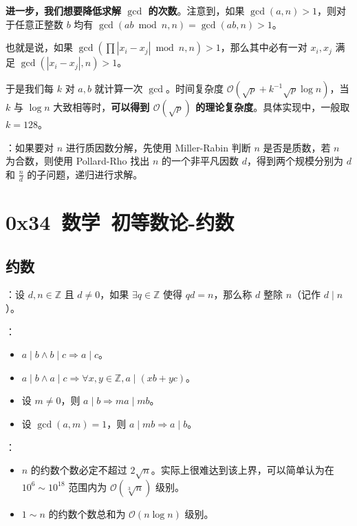 \textbf{进一步，我们想要降低求解 $\gcd$ 的次数}。注意到，如果 $\gcd(a, n) > 1$，则对于任意正整数 $b$ 均有 $\gcd(ab \bmod n, n) = \gcd(ab, n) > 1$。

也就是说，如果 $\gcd\left(\prod |x_i - x_j| \bmod n, n\right) > 1$，那么其中必有一对 $x_i, x_j$ 满足 $\gcd(|x_i - x_j|, n) > 1$。

于是我们每 $k$ 对 $a, b$ 就计算一次 $\gcd$。时间复杂度 $\mathcal{O}(\sqrt{p} + k^{-1}\sqrt{p} \log n)$，当 $k$ 与 $\log n$ 大致相等时，\textbf{可以得到 $\mathcal{O}(\sqrt{p})$ 的理论复杂度}。具体实现中，一般取 $k = 128$。

：如果要对 $n$ 进行质因数分解，先使用 Miller-Rabin 判断 $n$ 是否是质数，若 $n$ 为合数，则使用 Pollard-Rho 找出 $n$ 的一个非平凡因数 $d$，得到两个规模分别为 $d$ 和 $\frac{n}{d}$ 的子问题，递归进行求解。


\section{0x34\ 数学\ 初等数论-约数}
\label{sec:0x34b}

\subsection{约数}

：设 $d, n \in \mathbb{Z}$ 且 $d \neq 0$，如果 $\exists q \in \mathbb{Z}$ 使得 $qd = n$，那么称 $d$ 整除 $n$（记作 $d \mid n$）。

：

\begin{itemize}
    \item $a \mid b \land b \mid c \Longrightarrow a\mid c$。
    \item $a \mid b \land a \mid c \Longrightarrow \forall x, y \in \mathbb{Z}, a \mid (xb + yc)$。
    \item 设 $m \neq 0$，则 $a \mid b \Longrightarrow ma \mid mb$。
    \item 设 $\gcd(a, m) = 1$，则 $a \mid mb \Longrightarrow a\mid b$。
\end{itemize}

：

\begin{itemize}
    \item $n$ 的约数个数必定不超过 $2\sqrt{n}$。实际上很难达到该上界，可以简单认为在 $10^6 \sim 10^{18}$ 范围内为 $\mathcal{O}(\sqrt[3]{n})$ 级别。
    \item $1\sim n$ 的约数个数总和为 $\mathcal{O}(n \log n)$ 级别。
\end{itemize}

